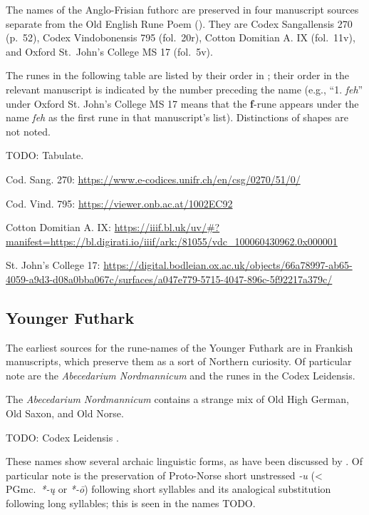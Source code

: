 The names of the Anglo-Frisian futhorc are preserved in four manuscript sources separate from the Old English Rune Poem ().  They are Codex Sangallensis 270 (p.~52), Codex Vindobonensis 795 (fol.~20r), Cotton Domitian A. IX (fol.~11v), and Oxford St.~John’s College MS 17 (fol.~5v).

The runes in the following table are listed by their order in ; their order in the relevant manuscript is indicated by the number preceding the name (e.g., “1. \emph{feh}” under Oxford St. John's College MS 17 means that the \textbf{f}-rune appears under the name \emph{feh} as the first rune in that manuscript’s list).  Distinctions of shapes are not noted.

TODO: Tabulate.

Cod. Sang. 270: \url{https://www.e-codices.unifr.ch/en/csg/0270/51/0/}

Cod. Vind. 795: \url{https://viewer.onb.ac.at/1002EC92}

Cotton Domitian A. IX: \url{https://iiif.bl.uk/uv/#?manifest=https://bl.digirati.io/iiif/ark:/81055/vdc_100060430962.0x000001}

St. John’s College 17: \url{https://digital.bodleian.ox.ac.uk/objects/66a78997-ab65-4059-a9d3-d08a0bba067c/surfaces/a047e779-5715-4047-896c-5f92217a379c/}

\subsection{Younger Futhark}

The earliest sources for the rune-names of the Younger Futhark are in Frankish manuscripts, which preserve them as a sort of Northern curiosity.  Of particular note are the \emph{Abecedarium Nordmannicum} and the runes in the Codex Leidensis.

The \emph{Abecedarium Nordmannicum} contains a strange mix of Old High German, Old Saxon, and Old Norse.

TODO: Codex Leidensis \parencite{Myrvoll2026}.

These names show several archaic linguistic forms, as have been discussed by \textcite{Myrvoll2026}.  Of particular note is the preservation of Proto-Norse short unstressed \emph{-u} (< PGmc.~\emph{*-ų} or \emph{*-ō}) following short syllables and its analogical substitution following long syllables; this is seen in the names TODO.

